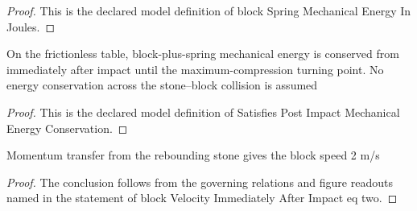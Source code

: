 \begin{proof}
  This is the declared model definition of block Spring Mechanical Energy In Joules.
\end{proof}
\begin{definition}
  \label{def:physics:phyx-mini-0763:phyxminiproblems-problemphyxmini0763-satisfiespostimpactmechanicalenergyconservation}
  On the frictionless table, block-plus-spring mechanical energy is conserved from immediately after impact until the maximum-compression turning point. No energy conservation across the stone--block collision is assumed
\end{definition}
\begin{proof}
  This is the declared model definition of Satisfies Post Impact Mechanical Energy Conservation.
\end{proof}
\begin{lemma}
  \label{lem:physics:phyx-mini-0763:phyxminiproblems-problemphyxmini0763-blockvelocityimmediatelyafterimpact-eq-two}
  Momentum transfer from the rebounding stone gives the block speed 2 m/s
\end{lemma}
\begin{proof}
  The conclusion follows from the governing relations and figure readouts named in the statement of block Velocity Immediately After Impact eq two.
\end{proof}
